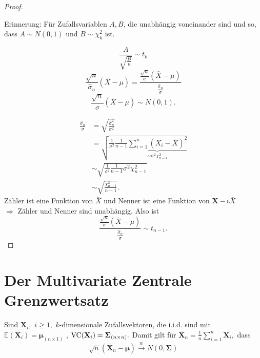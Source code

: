 \documentclass{tstextbook}
\begin{document}
\begin{proof}
	\begin{remark}
		Erinnerung: Für Zufallsvariablen $ A,B $, die unabhängig voneinander sind und so, dass $ A \sim N(0,1) $ und $ B \sim \chi_k^2 $ ist.
	\end{remark}
	
	\[
	\frac{A}{\sqrt{\frac{B}{n}}}\sim t_k
	\]
	 \[
	 \frac{\sqrt{n}}{\hat{\sigma}_n}(\bar{X}-\mu) = \frac{\frac{\sqrt{n}}{\sigma}(\bar{X}-\mu)}{\frac{\hat{\sigma}_n}{\sigma}}
	 \]
	 \[
	 \frac{\sqrt{n}}{\sigma}(\bar{X}-\mu) \sim N(0,1).
	 \]
	
	\[
	\begin{aligned}	
	\frac{\hat{\sigma}_n}{\sigma} & = \sqrt{\frac{\hat{\sigma}_n^2}{\sigma^2}} \\
	& = \sqrt{\frac{1}{\sigma^2}\frac{1}{n-1}\underbrace{\sum_{i=1}^{n}(X_i-\bar{X})^2}_{\sim \sigma^2 \chi_{n-1}^2}} \\
	& \sim \sqrt{\frac{1}{\sigma^2}\frac{1}{n-1} \sigma^2 \chi_{n-1}^2} \\
	& \sim \sqrt{\frac{\chi_{n-1}^2}{n-1}}.
	\end{aligned}
	\]
	Zähler ist eine Funktion von $ \bar{X} $ und Nenner ist eine Funktion von $ \mathbf{X}-\boldsymbol{\iota} \bar{X} $ \\
	$ \Rightarrow $ Zähler und Nenner sind unabhängig. Also ist 
	\[
	\frac{\frac{\sqrt{n}}{\sigma}(\bar{X}-\mu)}{\frac{\hat{\sigma}_n}{\sigma}} \sim t_{n-1}.
	\]
	
\end{proof}



\section{Der Multivariate Zentrale Grenzwertsatz}



\begin{satz}
	
	Sind $ \mathbf{X}_i,$  $ i\ge 1, $  $ k $-dimensionale Zufallsvektoren, die i.i.d. sind mit $ \mathbb{E}(\mathbf{X}_i)=\boldsymbol{\mu}_{(n \times 1)} $  , $ \operatorname{VC}(\mathbf{X}_i) = \boldsymbol{\Sigma}_{(n \times n)}. $
	Damit gilt für $ \mathbf{\bar{X}}_n = \frac{1}{n} \sum_{i=1}^{n} \mathbf{X}_i,$  dass 
	\[  \sqrt{n}(\mathbf{\bar{X}}_n-\boldsymbol{\mu}) \overset{w}{\longrightarrow} N(0, \boldsymbol{\Sigma}) \]
\end{satz}
\end{document}
